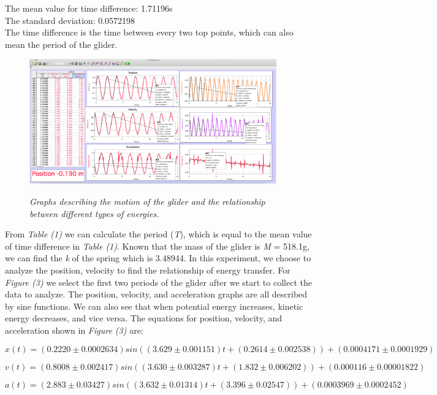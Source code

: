 \documentclass{article}
\begin{document}
The mean value for time difference: 1.71196s\\The standard deviation: 0.0572198\\The time difference is the time between every two top points, which can also mean the period of the glider.\\
\begin{figure}[h!]
\centering
\includegraphics[height=5.4cm]{Figures/figure3.png} \\
\caption{\textit{Graphs describing the motion of the glider and the relationship between different types of energies.}}
\label{fig:Logger Pro graphs}
\end{figure}

From \textit{Table (1)} we can calculate the period (\textit{T}), which is equal to the mean value of time difference in \textit{Table (1)}. Known that the mass of the glider is \textit{M} = 518.1g, we can find the \textit{k} of the spring which is 3.48944. In this experiment, we choose to analyze the position, velocity to find the relationship of energy transfer. For \textit{Figure (3)} we select the first two periods of the glider after we start to collect the data to analyze. The position, velocity, and acceleration graphs are all described by sine functions. We can also see that when potential energy increases, kinetic energy decreases, and vice versa. The equations for position, velocity, and acceleration shown in \textit{Figure (3)} are:

\begin{equation}
x(t)=(0.2220\pm0.0002634)sin((3.629\pm0.001151)t+(0.2614\pm0.002538))+(0.0004171\pm0.0001929)
\end{equation}

\begin{equation}
v(t)=(0.8008\pm0.002417)sin((3.630\pm0.003287)t+(1.832\pm0.006202))+(0.000116\pm0.00001822)
\end{equation}

\begin{equation}
a(t)=(2.883\pm0.03427)sin((3.632\pm0.01314)t+(3.396\pm0.02547))+(0.0003969\pm0.0002452)   
\end{equation}
\end{document}
